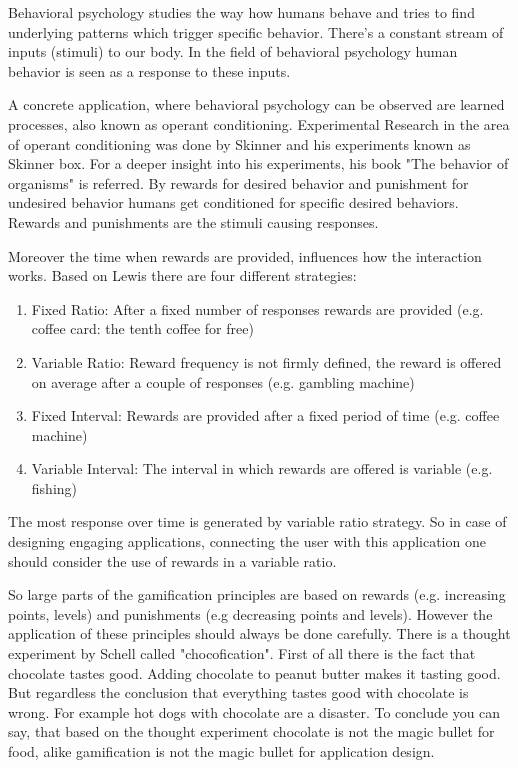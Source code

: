 Behavioral psychology studies the way how humans behave and tries to find underlying patterns which trigger specific behavior. There's a constant stream of inputs (stimuli) to our body. In the field of  behavioral psychology human behavior is seen as a response to these inputs. \cite[p. 10]{lewisIrresistibleAppsMotivational2014}

A concrete application, where behavioral psychology can be observed are learned processes, also known as operant conditioning. Experimental Research in the area of operant conditioning was done by Skinner and his experiments known as Skinner box. For a deeper insight into his experiments, his book "The behavior of organisms" \cite{skinnerBehaviorOrganisms1938} is referred. By rewards for desired behavior and punishment for undesired behavior humans get conditioned for specific desired behaviors. Rewards and punishments are the stimuli causing responses. \cite[p. 11]{lewisIrresistibleAppsMotivational2014}

Moreover the time when rewards are provided, influences how the interaction works.
Based on Lewis \cite[p. 10]{lewisIrresistibleAppsMotivational2014} there are four different strategies:
\begin{enumerate}
	\item Fixed Ratio: After a fixed number of responses rewards are provided (e.g. coffee card: the tenth coffee for free)
	\item Variable Ratio: Reward frequency is not firmly defined, the reward is offered on average after a couple of responses (e.g. gambling machine)
	\item Fixed Interval: Rewards are provided after a fixed period of time (e.g. coffee machine)
	\item Variable Interval: The interval in which rewards are offered is variable (e.g. fishing)
\end{enumerate}

The most response over time is generated by variable ratio strategy. So in case of designing engaging applications, connecting the user with this application one should consider the use of rewards in a variable ratio. \cite[p. 11]{lewisIrresistibleAppsMotivational2014}

So large parts of the gamification principles are based on rewards (e.g. increasing points, levels) and punishments (e.g decreasing points and levels). However the application of these principles should always be done carefully. There is a thought experiment by Schell called "chocofication". First of all there is the fact that chocolate tastes good. Adding chocolate to peanut butter makes it tasting good. But regardless the conclusion that everything tastes good with chocolate is wrong. For example hot dogs with chocolate are a disaster. 
To conclude you can say, that based on the thought experiment chocolate is not the magic bullet for food, alike gamification is not the magic bullet for application design. \cite[p. 12]{lewisIrresistibleAppsMotivational2014}


